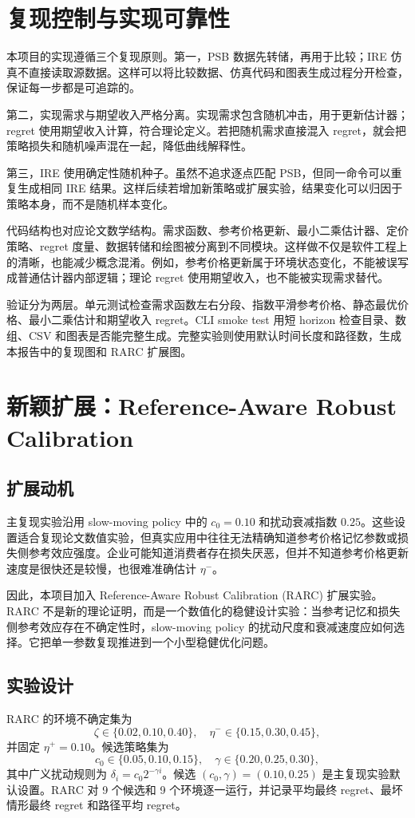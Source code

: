 \documentclass[conference]{../../LaTex_Template/IEEEtran}
\begin{document}
\section{复现控制与实现可靠性}
本项目的实现遵循三个复现原则。第一，PSB 数据先转储，再用于比较；IRE 仿真不直接读取源数据。这样可以将比较数据、仿真代码和图表生成过程分开检查，保证每一步都是可追踪的。

第二，实现需求与期望收入严格分离。实现需求包含随机冲击，用于更新估计器；regret 使用期望收入计算，符合理论定义。若把随机需求直接混入 regret，就会把策略损失和随机噪声混在一起，降低曲线解释性。

第三，IRE 使用确定性随机种子。虽然不追求逐点匹配 PSB，但同一命令可以重复生成相同 IRE 结果。这样后续若增加新策略或扩展实验，结果变化可以归因于策略本身，而不是随机样本变化。

代码结构也对应论文数学结构。需求函数、参考价格更新、最小二乘估计器、定价策略、regret 度量、数据转储和绘图被分离到不同模块。这样做不仅是软件工程上的清晰，也能减少概念混淆。例如，参考价格更新属于环境状态变化，不能被误写成普通估计器内部逻辑；理论 regret 使用期望收入，也不能被实现需求替代。

验证分为两层。单元测试检查需求函数左右分段、指数平滑参考价格、静态最优价格、最小二乘估计和期望收入 regret。CLI smoke test 用短 horizon 检查目录、数组、CSV 和图表是否能完整生成。完整实验则使用默认时间长度和路径数，生成本报告中的复现图和 RARC 扩展图。

\section{新颖扩展：Reference-Aware Robust Calibration}
\subsection{扩展动机}
主复现实验沿用 slow-moving policy 中的 $c_0=0.10$ 和扰动衰减指数 $0.25$。这些设置适合复现论文数值实验，但真实应用中往往无法精确知道参考价格记忆参数或损失侧参考效应强度。企业可能知道消费者存在损失厌恶，但并不知道参考价格更新速度是很快还是较慢，也很难准确估计 $\eta^-$。

因此，本项目加入 Reference-Aware Robust Calibration (RARC) 扩展实验。RARC 不是新的理论证明，而是一个数值化的稳健设计实验：当参考记忆和损失侧参考效应存在不确定性时，slow-moving policy 的扰动尺度和衰减速度应如何选择。它把单一参数复现推进到一个小型稳健优化问题。

\subsection{实验设计}
RARC 的环境不确定集为
\begin{equation}
\zeta \in \{0.02,0.10,0.40\},\quad
\eta^- \in \{0.15,0.30,0.45\},
\end{equation}
并固定 $\eta^+=0.10$。候选策略集为
\begin{equation}
c_0 \in \{0.05,0.10,0.15\},\quad
\gamma \in \{0.20,0.25,0.30\},
\end{equation}
其中广义扰动规则为 $\delta_i=c_0 2^{-\gamma i}$。候选 $(c_0,\gamma)=(0.10,0.25)$ 是主复现实验默认设置。RARC 对 9 个候选和 9 个环境逐一运行，并记录平均最终 regret、最坏情形最终 regret 和路径平均 regret。
\end{document}
